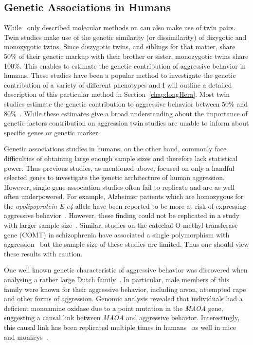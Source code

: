 \subsection{Genetic Associations in Humans}
\label{sub:genetic_associations_in_humans}
While~\citet{Maxson2005} only described molecular methods on can also make use of twin pairs.
Twin studies make use of the genetic similarity (or dissimilarity) of dizygotic and monozygotic twins.
Since diszygotic twins, and siblings for that matter, share 50\% of their genetic markup with their brother or sister, monozygotic twins share 100\%.
This enables to estimate the genetic contribution of aggressive behavior in humans.
These studies have been a popular method to investigate the genetic contribution of a variety of different phenotypes and I will outline a detailed description of this particular method in Section~\ref{chap:longHera}. %
Most twin studies estimate the genetic contribution to aggressive behavior between 50\% and 80\%~\cite{Porsch2016}.
While these estimates give a broad understanding about the importance of genetic factors contribution on aggression twin studies are unable to inform about specific genes or genetic marker.

Genetic associations studies in humans, on the other hand, commonly face difficulties of obtaining large enough sample sizes and therefore lack statistical power.
Thus previous studies, as mentioned above, focused on only a handful selected genes to investigate the genetic architecture of human aggression.
However, single gene association studies often fail to replicate and are as well often underpowered.
For example, Alzheimer patients which are homozygous for the \textit{apolipoprotein E e4} allele have been reported to be more at risk of expressing aggressive behavior~\cite{Craig2004a,VanDerFlier2006}.
However, these finding could not be replicated in a study with larger sample size~\cite{Hollingworth2006}.
Similar, studies on the catechol-O-methyl transferase gene (COMT) in schizophrenia have associated a single polymorphism with aggression~\cite{Hirata2013,Calati2011} but the sample size of these studies are limited.
Thus one should view these results with caution.

One well known genetic characteristic of aggressive behavior was discovered when analysing a rather large Dutch family~\cite{Brunner1993}.
In particular, male members of this family were known for their aggressive behavior, including arson, attempted rape and other forms of aggression.
Genomic analysis revealed that individuals had a deficient monoamine oxidase due to a point mutation in the \textit{MAOA} gene, suggesting a causal link between \textit{MAOA} and aggressive behavior.
Interestingly, this causal link has been replicated multiple times in humans~\cite{Huang2004,Manuck2000} as well in mice~\cite{Cases1995b} and monkeys~\cite{Newman2005}.

